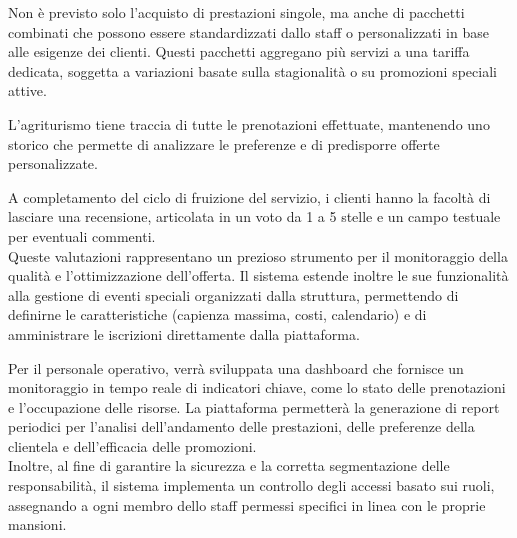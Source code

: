 \documentclass[a4paper,11pt]{report}
\begin{document}
Non è previsto solo l'acquisto di prestazioni singole, ma anche di pacchetti combinati che possono essere standardizzati dallo staff o personalizzati in base alle esigenze dei clienti. 
Questi pacchetti aggregano più servizi a una tariffa dedicata, soggetta a variazioni basate sulla stagionalità o su promozioni speciali attive.

L'agriturismo tiene traccia di tutte le prenotazioni effettuate, mantenendo uno storico che permette di analizzare le preferenze e di predisporre offerte personalizzate.

A completamento del ciclo di fruizione del servizio, i clienti hanno la facoltà di lasciare una recensione, articolata in un voto da 1 a 5 stelle e un campo testuale per eventuali commenti. 
\\Queste valutazioni rappresentano un prezioso strumento per il monitoraggio della qualità e l'ottimizzazione dell'offerta. Il sistema estende inoltre le sue funzionalità alla gestione di eventi speciali organizzati dalla struttura, permettendo di definirne le caratteristiche (capienza massima, costi, calendario) e di amministrare le iscrizioni direttamente dalla piattaforma.

Per il personale operativo, verrà sviluppata una dashboard che fornisce un monitoraggio in tempo reale di indicatori chiave, come lo stato delle prenotazioni e l'occupazione delle risorse. 
La piattaforma permetterà la generazione di report periodici per l'analisi dell'andamento delle prestazioni, delle preferenze della clientela e dell'efficacia delle promozioni. 
\\Inoltre, al fine di garantire la sicurezza e la corretta segmentazione delle responsabilità, 
il sistema implementa un controllo degli accessi basato sui ruoli, assegnando a ogni membro dello staff permessi specifici in linea con le proprie mansioni.
\end{document}
